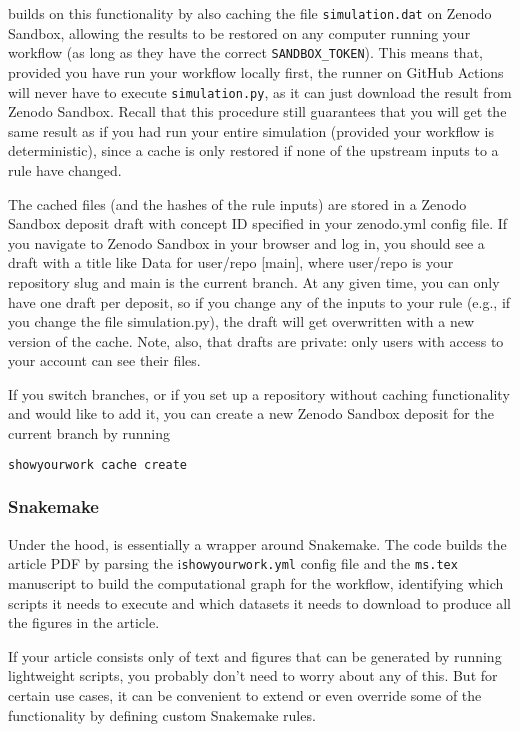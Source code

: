 \documentclass{aa}
\begin{document}
\showyourwork builds on this functionality by also caching the file \texttt{simulation.dat} on Zenodo Sandbox, allowing the results to be restored on any computer running your workflow (as long as they have the correct \texttt{SANDBOX\_TOKEN}).
This means that, provided you have run your workflow locally first, the runner on GitHub Actions will never have to execute \texttt{simulation.py}, as it can just download the result from Zenodo Sandbox.
Recall that this procedure still guarantees that you will get the same result as if you had run your entire simulation (provided your workflow is deterministic), since a cache is only restored if none of the upstream inputs to a rule have changed.

The cached files (and the hashes of the rule inputs) are stored in a Zenodo Sandbox deposit draft with concept ID specified in your zenodo.yml config file. If you navigate to Zenodo Sandbox in your browser and log in, you should see a draft with a title like Data for user/repo [main], where user/repo is your repository slug and main is the current branch. At any given time, you can only have one draft per deposit, so if you change any of the inputs to your rule (e.g., if you change the file simulation.py), the draft will get overwritten with a new version of the cache. Note, also, that drafts are private: only users with access to your account can see their files.

If you switch branches, or if you set up a repository without caching functionality and would like to add it, you can create a new Zenodo Sandbox deposit for the current branch by running

\begin{lstlisting}[language=bash]
showyourwork cache create
\end{lstlisting}

\subsubsection{Snakemake}

Under the hood, \showyourwork is essentially a wrapper around Snakemake.
The code builds the article PDF by parsing the i\texttt{showyourwork.yml} config file and the \texttt{ms.tex} manuscript to build the computational graph for the workflow, identifying which scripts it needs to execute and which datasets it needs to download to produce all the figures in the article.

If your article consists only of text and figures that can be generated by running lightweight scripts, you probably don't need to worry about any of this.
But for certain use cases, it can be convenient to extend or even override some of the \showyourwork functionality by defining custom Snakemake rules.
\end{document}
